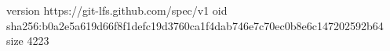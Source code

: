 version https://git-lfs.github.com/spec/v1
oid sha256:b0a2e5a619d66f8f1defc19d3760ca1f4dab746e7c70ec0b8e6c147202592b64
size 4223
